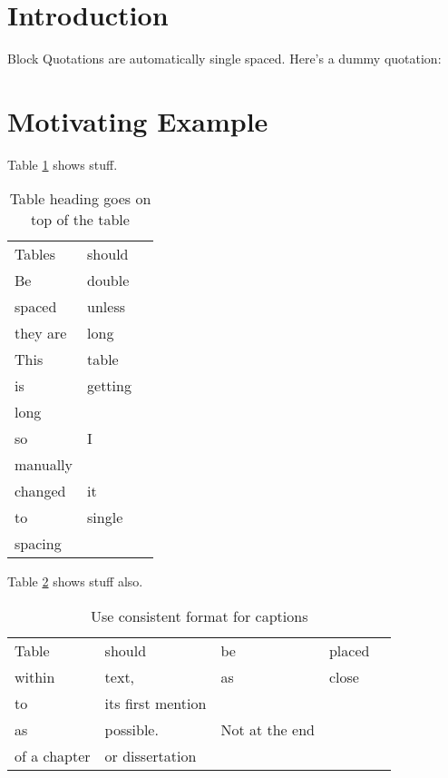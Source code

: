 \section{Introduction}
\label{section_intro}

Block Quotations are automatically single spaced. Here's a dummy quotation:
\begin{quotation}
  \blindtext
\end{quotation}

\section{Motivating Example}
Table \ref{tab:label} shows stuff. \blindtext
\begin{table}[tp]
  \centering
  \caption[Table heading]{Table heading goes on top of the table}
  \label{tab:label}
  \renewcommand{\arraystretch}{1.2} %
  \begin{tabular}{@{}lll@{}}
    Tables & should \\
    Be & double\\
    spaced & unless & \\
    they are & long\\
    This & table\\
    is & getting\\
    long\\
    so & I\\
    manually\\
    changed &it \\
    to & single\\
    spacing
  \end{tabular}
\end{table}
Table \ref{tab:label2} shows stuff also.
\begin{table}[tp]
  \centering
  \caption{Use consistent format for captions}
  \label{tab:label2}
  \begin{tabular}{@{}lllll@{}}
    Table & should & be & placed\\
    within & text, & as & close\\
    to & its first mention\\
    as & possible. & Not at the end\\
    of a chapter & or dissertation
  \end{tabular}
\end{table}

\blindtext[2]
